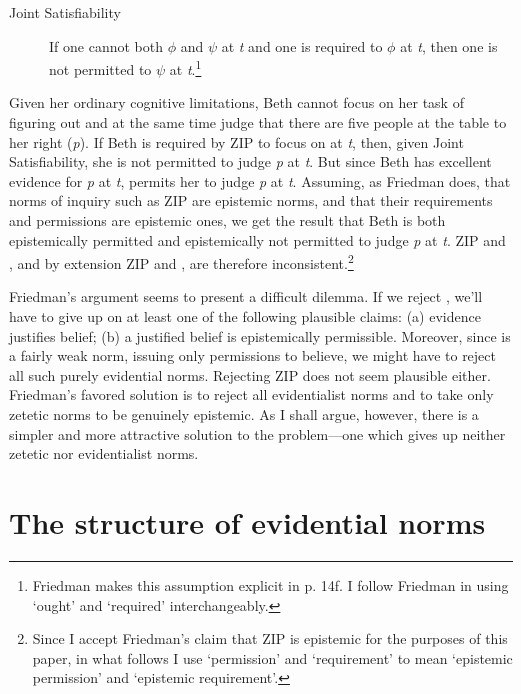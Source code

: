 \documentclass[12pt]{article}
\begin{document}
\newcommand{\opic}{Joint Satisfiability}
\begin{description}
    \item[\opic{}] If one cannot both $\phi$ and $\psi$ at \textit{t} and one is required to $\phi$ at \textit{t}, then one is not permitted to $\psi$ at \textit{t}.\footnote{Friedman makes this assumption explicit in p. 14f. I follow Friedman in using `ought' and `required' interchangeably.}
\end{description}
%
Given her ordinary cognitive limitations, Beth cannot focus on her task of figuring out  and at the same time judge that there are five people at the table to her right (\textit{p}). If Beth is required by ZIP to focus on  at \textit{t}, then, given \opic{}, she is not permitted to judge \textit{p} at \textit{t}. But since Beth has excellent evidence for \textit{p} at \textit{t}, \ep{} permits her to judge \textit{p} at \textit{t}. Assuming, as Friedman does, that norms of inquiry such as ZIP are epistemic norms, and that their requirements and permissions are epistemic ones, we get the result that Beth is both epistemically permitted and epistemically not permitted to judge \textit{p} at \textit{t}. ZIP and \ep{}, and by extension ZIP and \eo{}, are therefore inconsistent.\footnote{Since I accept Friedman's claim that ZIP is epistemic for the purposes of this paper, in what follows I use `permission' and `requirement' to mean `epistemic permission' and `epistemic requirement'.}

Friedman's argument seems to present a difficult dilemma. If we reject \ep{}, we'll have to give up on at least one of the following plausible claims: (a) evidence justifies belief; (b) a justified belief is epistemically permissible. Moreover, since \ep{} is a fairly weak norm, issuing only permissions to believe, we might have to reject all such purely evidential norms. Rejecting ZIP does not seem plausible either. Friedman's favored solution is to reject all evidentialist norms and to take only zetetic norms to be genuinely epistemic. As I shall argue, however, there is a simpler and more attractive solution to the problem---one which gives up neither zetetic nor evidentialist norms.

\section{The structure of evidential norms}\label{sec:struct}
\end{document}
